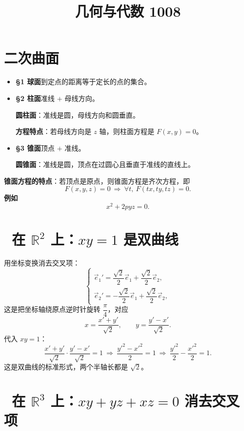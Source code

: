 \documentclass[UTF8,11pt]{ctexart}
\title{几何与代数 1008}
\date{}
\theoremstyle{cnthm}
\begin{document}
\maketitle

\section{二次曲面}

\begin{itemize}
\item \textbf{§1 球面}\quad 到定点的距离等于定长的点的集合。
\item \textbf{§2 柱面}\quad 准线 $+$ 母线方向。

\textbf{圆柱面}：准线是圆，母线方向和圆垂直。

\textbf{方程特点}：若母线方向是 $z$ 轴，则柱面方程是
$F(x,y)=0$。
\item \textbf{§3 锥面}\quad 顶点 $+$ 准线。

\textbf{圆锥面}：准线是圆，顶点在过圆心且垂直于准线的直线上。
\end{itemize}

\textbf{锥面方程的特点}：若顶点是原点，则锥面方程是齐次方程，即
\[
F(x,y,z)=0\ \Longrightarrow\ \forall t,\ F(tx,ty,tz)=0 .
\]
\textbf{例如}
\[
x^2+2pyz=0 .
\]

\section{\ 在 $\mathbb R^2$ 上：$xy=1$ 是双曲线}

用坐标变换消去交叉项：
\[
\begin{cases}
\vec e_1'=\dfrac{\sqrt2}{2}\vec e_1+\dfrac{\sqrt2}{2}\vec e_2,\\[8pt]
\vec e_2'=-\dfrac{\sqrt2}{2}\vec e_1+\dfrac{\sqrt2}{2}\vec e_2,
\end{cases}
\]
这是把坐标轴绕原点逆时针旋转 $\dfrac\pi4$，对应
\[
x=\frac{x'+y'}{\sqrt2},\qquad
y=\frac{y'-x'}{\sqrt2}.
\]
代入 $xy=1$：
\[
\frac{x'+y'}{\sqrt2}\cdot\frac{y'-x'}{\sqrt2}=1
\ \Longrightarrow\
\frac{y'^2-x'^2}{2}=1
\ \Longrightarrow\
\frac{y'^2}{2}-\frac{x'^2}{2}=1 .
\]
这是双曲线的标准形式，两个半轴长都是 $\sqrt2$。

\section{\ 在 $\mathbb R^3$ 上：$xy+yz+xz=0$ 消去交叉项}
\end{document}
